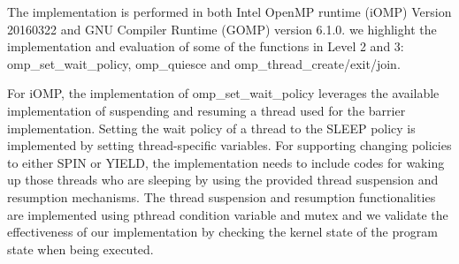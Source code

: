 The implementation is performed in both Intel OpenMP runtime (iOMP) Version 20160322 and GNU Compiler Runtime (GOMP) version 6.1.0. 
we highlight the implementation and evaluation of some of the functions in Level 2 and 3: 
{\sf omp\_set\_wait\_policy}, {\sf omp\_quiesce} and {\sf omp\_thread\_create/exit/join}. 

For iOMP, the implementation of {\sf omp\_set\_wait\_policy} leverages the available 
implementation of suspending and resuming a thread used for the barrier implementation. Setting the 
wait policy of a thread to the {\sf SLEEP} policy is implemented by setting thread-specific variables. For
supporting changing policies to either {\sf SPIN} or {\sf YIELD}, the implementation needs to include codes for 
waking up those threads who are sleeping by using the provided thread suspension and resumption mechanisms.  
The thread suspension and resumption functionalities are implemented using pthread condition variable and mutex and 
we validate the effectiveness of our implementation by checking the kernel state of the program state when being 
executed.

\begin{table}[htbp]
	\centering
{}  
\label{table:implement_wait}
\caption{Implementation of wait policies }
\end{table}


